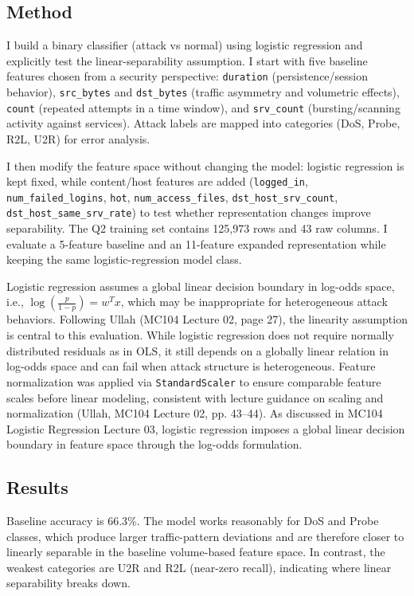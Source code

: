 \documentclass[11pt]{article}
\begin{document}
\subsection{Method}
I build a binary classifier (attack vs normal) using logistic regression and explicitly test the linear-separability assumption. I start with five baseline features chosen from a security perspective: \texttt{duration} (persistence/session behavior), \texttt{src\_bytes} and \texttt{dst\_bytes} (traffic asymmetry and volumetric effects), \texttt{count} (repeated attempts in a time window), and \texttt{srv\_count} (bursting/scanning activity against services). Attack labels are mapped into categories (DoS, Probe, R2L, U2R) for error analysis.

I then modify the feature space without changing the model: logistic regression is kept fixed, while content/host features are added (\texttt{logged\_in}, \texttt{num\_failed\_logins}, \texttt{hot}, \texttt{num\_access\_files}, \texttt{dst\_host\_srv\_count}, \texttt{dst\_host\_same\_srv\_rate}) to test whether representation changes improve separability.
The Q2 training set contains 125{,}973 rows and 43 raw columns. I evaluate a 5-feature baseline and an 11-feature expanded representation while keeping the same logistic-regression model class.

Logistic regression assumes a global linear decision boundary in log-odds space, i.e., $\log\left(\frac{p}{1-p}\right)=w^T x$, which may be inappropriate for heterogeneous attack behaviors.
Following Ullah (MC104 Lecture 02, page 27), the linearity assumption is central to this evaluation. While logistic regression does not require normally distributed residuals as in OLS, it still depends on a globally linear relation in log-odds space and can fail when attack structure is heterogeneous.
Feature normalization was applied via \texttt{StandardScaler} to ensure comparable feature scales before linear modeling, consistent with lecture guidance on scaling and normalization (Ullah, MC104 Lecture 02, pp. 43--44).
As discussed in MC104 Logistic Regression Lecture 03, logistic regression imposes a global linear decision boundary in feature space through the log-odds formulation.

\subsection{Results}
Baseline accuracy is 66.3\%. The model works reasonably for DoS and Probe classes, which produce larger traffic-pattern deviations and are therefore closer to linearly separable in the baseline volume-based feature space. In contrast, the weakest categories are U2R and R2L (near-zero recall), indicating where linear separability breaks down.
\end{document}
